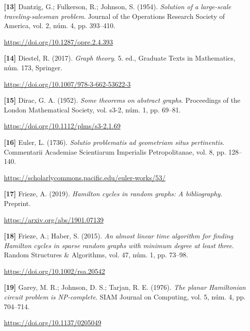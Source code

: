\documentclass[11pt,a4paper]{article}
\newcommand{\referencia}[1]{\par\addvspace{0.8\baselineskip}\noindent\hangindent=1.1cm\hangafter=1 #1\par\nopagebreak}
\begin{document}
\begin{samepage}
\referencia{\textbf{[13]} Dantzig, G.; Fulkerson, R.; Johnson, S. (1954). \textit{Solution of a large-scale traveling-salesman problem}. Journal of the Operations Research Society of America, vol. 2, núm. 4, pp. 393--410.}
 {\small\url{https://doi.org/10.1287/opre.2.4.393}}\par
\end{samepage}
\begin{samepage}
\referencia{\textbf{[14]} Diestel, R. (2017). \textit{Graph theory}. 5. ed., Graduate Texts in Mathematics, núm. 173, Springer.}
 {\small\url{https://doi.org/10.1007/978-3-662-53622-3}}\par
\end{samepage}
\begin{samepage}
\referencia{\textbf{[15]} Dirac, G. A. (1952). \textit{Some theorems on abstract graphs}. Proceedings of the London Mathematical Society, vol. s3-2, núm. 1, pp. 69--81.}
 {\small\url{https://doi.org/10.1112/plms/s3-2.1.69}}\par
\end{samepage}
\begin{samepage}
\referencia{\textbf{[16]} Euler, L. (1736). \textit{Solutio problematis ad geometriam situs pertinentis}. Commentarii Academiae Scientiarum Imperialis Petropolitanae, vol. 8, pp. 128--140.}
 {\small\url{https://scholarlycommons.pacific.edu/euler-works/53/}}\par
\end{samepage}
\begin{samepage}
\referencia{\textbf{[17]} Frieze, A. (2019). \textit{Hamilton cycles in random graphs: A bibliography}. Preprint.}
 {\small\url{https://arxiv.org/abs/1901.07139}}\par
\end{samepage}
\begin{samepage}
\referencia{\textbf{[18]} Frieze, A.; Haber, S. (2015). \textit{An almost linear time algorithm for finding {Hamilton} cycles in sparse random graphs with minimum degree at least three}. Random Structures \& Algorithms, vol. 47, núm. 1, pp. 73--98.}
 {\small\url{https://doi.org/10.1002/rsa.20542}}\par
\end{samepage}
\begin{samepage}
\referencia{\textbf{[19]} Garey, M. R.; Johnson, D. S.; Tarjan, R. E. (1976). \textit{The planar {Hamiltonian} circuit problem is {NP}-complete}. SIAM Journal on Computing, vol. 5, núm. 4, pp. 704--714.}
 {\small\url{https://doi.org/10.1137/0205049}}\par
\end{samepage}
\end{document}
